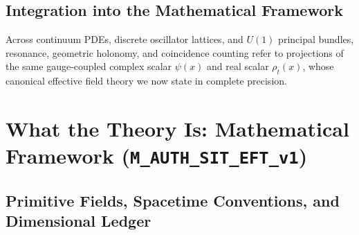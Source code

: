 \subsection{Integration into the Mathematical Framework}

Across continuum PDEs, discrete oscillator lattices, and $U(1)$ principal bundles, resonance, geometric holonomy, and coincidence counting refer to projections of the same gauge-coupled complex scalar $\psi(x)$ and real scalar $\rho_t(x)$, whose canonical effective field theory we now state in complete precision.

\section{What the Theory Is: Mathematical Framework (\texttt{M\_AUTH\_SIT\_EFT\_v1})}
\label{sec:framework}
\label{sec:quantitative-coupling}

\subsection{Primitive Fields, Spacetime Conventions, and Dimensional Ledger}


